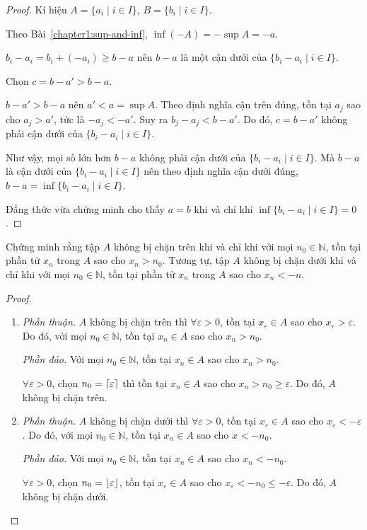 \documentclass[class=analysis,crop=false]{standalone}
\begin{document}
\begin{proof}
    Kí hiệu $A = \{ a_{i} \mid i\in I \}$, $B = \{ b_{i} \mid i\in I \}$.
    \par Theo Bài~\ref{chapter1:sup-and-inf}, $\inf(-A) = -\sup A = -a$.
    \par $b_{i} - a_{i} = b_{i} + (-a_{i}) \ge b - a$ nên $b - a$ là một cận dưới của $\{ b_{i} - a_{i}\mid i\in I \}$.
    \par Chọn $c = b - a' > b - a$.
    \par $b - a' > b - a$ nên $a' < a = \sup A$. Theo định nghĩa cận trên đúng, tồn tại $a_{j}$ sao cho $a_{j} > a'$, tức là $-a_{j} < -a'$. Suy ra $b_{j} - a_{j} < b - a'$. Do đó, $c = b - a'$ không phải cận dưới của $\{ b_{i} - a_{i} \mid i\in I \}$.
    \par Như vậy, mọi số lớn hơn $b - a$ không phải cận dưới của $\{ b_{i} - a_{i}\mid i\in I \}$. Mà $b - a$ là cận dưới của $\{ b_{i} - a_{i} \mid i\in I \}$ nên theo định nghĩa cận dưới đúng, $b - a = \inf\{ b_{i} - a_{i} \mid i\in I \}$.
    \par Đẳng thức vừa chứng minh cho thấy $a = b$ khi và chỉ khi $\inf\{ b_{i} - a_{i} \mid i\in I \} = 0$.
\end{proof}

\begin{exercise}
    Chứng minh rằng tập $A$ không bị chặn trên khi và chỉ khi với mọi $n_{0}\in\mathbb{N}$, tồn tại phần tử $x_{n}$ trong $A$ sao cho $x_{n} > n_{0}$. Tương tự, tập $A$ không bị chặn dưới khi và chỉ khi với mọi $n_{0}\in\mathbb{N}$, tồn tại phần tử $x_{n}$ trong $A$ sao cho $x_{n} < -n$.
\end{exercise}

\begin{proof}
    \begin{enumerate}[label = (\roman*)]
        \item \textit{Phần thuận.} $A$ không bị chặn trên thì $\forall\varepsilon > 0$, tồn tại $x_{\varepsilon}\in A$ sao cho $x_{\varepsilon} > \varepsilon$. Do đó, với mọi $n_{0}\in\mathbb{N}$, tồn tại $x_{n}\in A$ sao cho $x_{n} > n_{0}$.
              \par \textit{Phần đảo.} Với mọi $n_{0}\in\mathbb{N}$, tồn tại $x_{n}\in A$ sao cho $x_{n} > n_{0}$.
              \par $\forall\varepsilon > 0$, chọn $n_{0} = \left\lceil{\varepsilon}\right\rceil$ thì tồn tại $x_{n}\in A$ sao cho $x_{n} > n_{0} \ge \varepsilon$. Do đó, $A$ không bị chặn trên.
        \item \textit{Phần thuận.} $A$ không bị chặn dưới thì $\forall\varepsilon > 0$, tồn tại $x_{\varepsilon}\in A$ sao cho $x_{\varepsilon} < -\varepsilon$. Do đó, với mọi $n_{0}\in\mathbb{N}$, tồn tại $x_{n}\in A$ sao cho $x_{} < -n_{0}$.
              \par \textit{Phần đảo.} Với mọi $n_{0}\in\mathbb{N}$, tồn tại $x_{n}\in A$ sao cho $x_{n} < -n_{0}$.
              \par $\forall\varepsilon > 0$, chọn $n_{0} = \left\lfloor{\varepsilon}\right\rfloor$, tồn tại $x_{\varepsilon}\in A$ sao cho $x_{\varepsilon} < -n_{0} \le -\varepsilon$. Do đó, $A$ không bị chặn dưới.
    \end{enumerate}
\end{proof}
\end{document}
